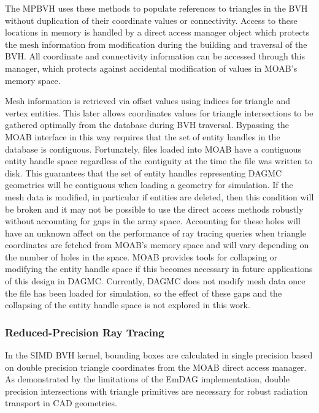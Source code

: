 The MPBVH uses these methods to populate references to triangles in the BVH
without duplication of their coordinate values or connectivity. Access to these
locations in memory is handled by a direct access manager object which protects
the mesh information from modification during the building and traversal of the
BVH. All coordinate and connectivity information can be accessed through this
manager, which protects against accidental modification of values in MOAB's
memory space.

Mesh information is retrieved via offset values using indices for triangle and
vertex entities. This later allows coordinates values for triangle intersections
to be gathered optimally from the database during BVH traversal. Bypassing the
MOAB interface in this way requires that the set of entity handles in the
database is contiguous. Fortunately, files loaded into MOAB have a contiguous
entity handle space regardless of the contiguity at the time the file was
written to disk. This guarantees that the set of entity handles representing
DAGMC geometries will be contiguous when loading a geometry for simulation. If
the mesh data is modified, in particular if entities are deleted, then this
condition will be broken and it may not be possible to use the direct access
methods robustly without accounting for gaps in the array space. Accounting for
these holes will have an unknown affect on the performance of ray tracing
queries when triangle coordinates are fetched from MOAB's memory space and will
vary depending on the number of holes in the space. MOAB provides tools for
collapsing or modifying the entity handle space if this becomes necessary in
future applications of this design in DAGMC. Currently, DAGMC does not modify
mesh data once the file has been loaded for simulation, so the effect of these
gaps and the collapsing of the entity handle space is not explored in this work.

\subsubsection{Reduced-Precision Ray Tracing}\label{subsubsec:reduced_precision}

In the SIMD BVH kernel, bounding boxes are calculated in single precision based
on double precision triangle coordinates from the MOAB direct access manager. As
demonstrated by the limitations of the EmDAG implementation, double precision
intersections with triangle primitives are necessary for robust radiation
transport in CAD geometries.


